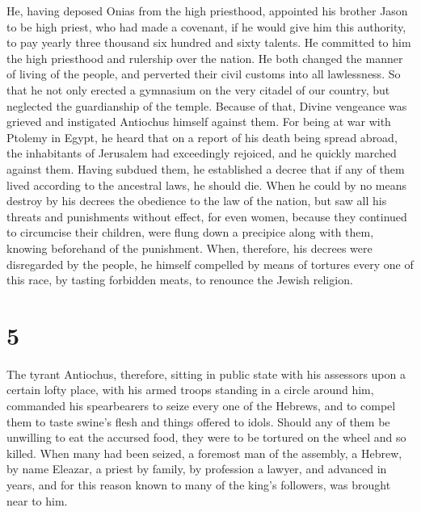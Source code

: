  He, having deposed Onias from the high priesthood,
appointed his brother Jason to be high priest,  who had
made a covenant, if he would give him this authority, to pay yearly
three thousand six hundred and sixty talents.  He committed
to him the high priesthood and rulership over the nation. 
He both changed the manner of living of the people, and perverted their
civil customs into all lawlessness.  So that he not only
erected a gymnasium on the very citadel of our country, but neglected
the guardianship of the temple.  Because of that, Divine
vengeance was grieved and instigated Antiochus himself against them.
 For being at war with Ptolemy in Egypt, he heard that on a
report of his death being spread abroad, the inhabitants of Jerusalem
had exceedingly rejoiced, and he quickly marched against them.
 Having subdued them, he established a decree that if any
of them lived according to the ancestral laws, he should die.
 When he could by no means destroy by his decrees the
obedience to the law of the nation, but saw all his threats and
punishments without effect,  for even women, because they
continued to circumcise their children, were flung down a precipice
along with them, knowing beforehand of the punishment. 
When, therefore, his decrees were disregarded by the people, he himself
compelled by means of tortures every one of this race, by tasting
forbidden meats, to renounce the Jewish religion.

\hypertarget{section-4}{%
\section{5}\label{section-4}}

 The tyrant Antiochus, therefore, sitting in public state
with his assessors upon a certain lofty place, with his armed troops
standing in a circle around him,  commanded his spearbearers
to seize every one of the Hebrews, and to compel them to taste swine's
flesh and things offered to idols.  Should any of them be
unwilling to eat the accursed food, they were to be tortured on the
wheel and so killed.  When many had been seized, a foremost
man of the assembly, a Hebrew, by name Eleazar, a priest by family, by
profession a lawyer, and advanced in years, and for this reason known to
many of the king's followers, was brought near to him.

